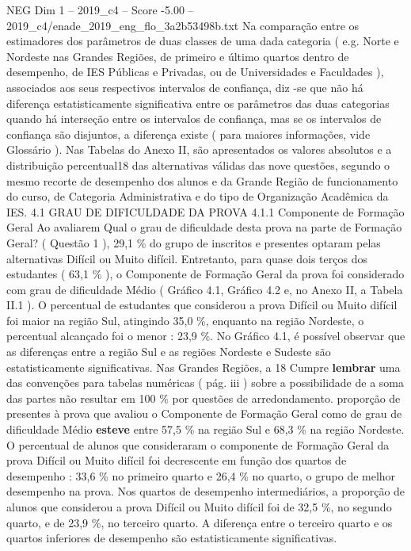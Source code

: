 \begin{textsample}{NEG Dim 1 – 2019\_c4 – Score -5.00 – 2019\_c4/enade\_2019\_eng\_flo\_3a2b53498b.txt}
Na comparação entre os estimadores dos parâmetros de duas classes de uma dada categoria ( e.g.
Norte e Nordeste nas Grandes Regiões, de primeiro e último quartos dentro de desempenho, de IES Públicas e Privadas, ou de Universidades e Faculdades ), associados aos seus respectivos intervalos de confiança, diz -se que não há diferença estatisticamente significativa entre os parâmetros das duas categorias quando há interseção entre os intervalos de confiança, mas se os intervalos de confiança são disjuntos, a diferença existe ( para maiores informações, vide Glossário ).
Nas Tabelas do Anexo II, são apresentados os valores absolutos e a distribuição percentual18 das alternativas válidas das nove questões, segundo o mesmo recorte de desempenho dos alunos e da Grande Região de funcionamento do curso, de Categoria Administrativa e do tipo de Organização Acadêmica da IES. 4.1 GRAU DE DIFICULDADE DA PROVA 4.1.1 Componente de Formação Geral Ao avaliarem Qual o grau de dificuldade desta prova na parte de Formação Geral? ( Questão 1 ), 29,1 \% do grupo de inscritos e presentes optaram pelas alternativas Difícil ou Muito difícil.
Entretanto, para quase dois terços dos estudantes ( 63,1 \% ), o Componente de Formação Geral da prova foi considerado com grau de dificuldade Médio ( Gráfico 4.1, Gráfico 4.2 e, no Anexo II, a Tabela II.1 ).
O percentual de estudantes que considerou a prova Difícil ou Muito difícil foi maior na região Sul, atingindo 35,0 \%, enquanto na região Nordeste, o percentual alcançado foi o menor : 23,9 \%.
No Gráfico 4.1, é possível observar que as diferenças entre a região Sul e as regiões Nordeste e Sudeste são estatisticamente significativas.
Nas Grandes Regiões, a 18 Cumpre \textbf{lembrar} uma das convenções para tabelas numéricas ( pág. iii ) sobre a possibilidade de a soma das partes não resultar em 100 \% por questões de arredondamento. proporção de presentes à prova que avaliou o Componente de Formação Geral como de grau de dificuldade Médio \textbf{esteve} entre 57,5 \% na região Sul e 68,3 \% na região Nordeste.
O percentual de alunos que consideraram o componente de Formação Geral da prova Difícil ou Muito difícil foi decrescente em função dos quartos de desempenho : 33,6 \% no primeiro quarto e 26,4 \% no quarto, o grupo de melhor desempenho na prova.
Nos quartos de desempenho intermediários, a proporção de alunos que considerou a prova Difícil ou Muito difícil foi de 32,5 \%, no segundo quarto, e de 23,9 \%, no terceiro quarto.
A diferença entre o terceiro quarto e os quartos inferiores de desempenho são estatisticamente significativas.

\end{textsample}
